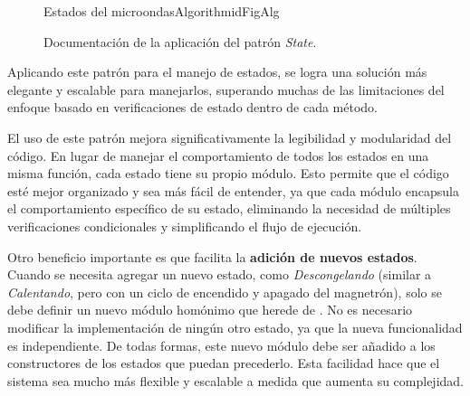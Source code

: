\begin{figure}
\label{docState}
\caption{Documentación de la aplicación del patrón \textit{State}.}
\begin{pattern}[]{Estados del microondas}{Algorithm}{idFigAlg}
\assigns
{}

\end{pattern}
\end{figure}


Aplicando este patrón para el manejo de estados, se logra una solución más elegante y escalable para manejarlos, superando muchas de las limitaciones del enfoque basado en verificaciones de estado dentro de cada método.


El uso de este patrón mejora significativamente la legibilidad y modularidad del código. En lugar de manejar el comportamiento de todos los estados en una misma función, cada estado tiene su propio módulo. Esto permite que el código esté mejor organizado y sea más fácil de entender, ya que cada módulo encapsula el comportamiento específico de su estado, eliminando la necesidad de múltiples verificaciones condicionales y simplificando el flujo de ejecución.

Otro beneficio importante es que facilita la \textbf{adición de nuevos estados}. Cuando se necesita agregar un nuevo estado, como \textit{Descongelando} (similar a \textit{Calentando}, pero con un ciclo de encendido y apagado del magnetrón), solo se debe definir un nuevo módulo homónimo que herede de \EstadoMicroondas. No es necesario modificar la implementación de ningún otro estado, ya que la nueva funcionalidad es independiente. De todas formas, este nuevo módulo debe ser añadido a los constructores de los estados que puedan precederlo. Esta facilidad hace que el sistema sea mucho más flexible y escalable a medida que aumenta su complejidad.

